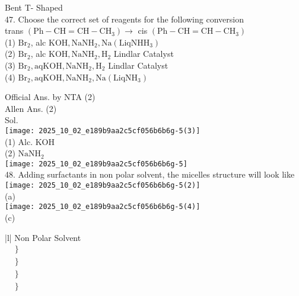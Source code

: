 \documentclass[10pt]{article}
\begin{document}
Bent T- Shaped\\
47. Choose the correct set of reagents for the following conversion\\
trans \(\left(\mathrm{Ph}-\mathrm{CH}=\mathrm{CH}-\mathrm{CH}_{3}\right) \rightarrow\) cis \(\left(\mathrm{Ph}-\mathrm{CH}=\mathrm{CH}-\mathrm{CH}_{3}\right)\)\\
(1) \(\mathrm{Br}_{2}\), alc \(\mathrm{KOH}, \mathrm{NaNH}_{2}, \mathrm{Na}\left(\mathrm{Liq} \mathrm{NH} \mathrm{H}_{3}\right)\)\\
(2) \(\mathrm{Br}_{2}\), alc \(\mathrm{KOH}, \mathrm{NaNH}_{2}, \mathrm{H}_{2}\) Lindlar Catalyst\\
(3) \(\mathrm{Br}_{2}, \mathrm{aq} \mathrm{KOH}, \mathrm{NaNH}_{2}, \mathrm{H}_{2}\) Lindlar Catalyst\\
(4) \(\mathrm{Br}_{2}, \mathrm{aq} \mathrm{KOH}, \mathrm{NaNH}_{2}, \mathrm{Na}\left(\mathrm{Liq} \mathrm{NH}_{3}\right)\)

Official Ans. by NTA (2)\\
Allen Ans. (2)\\
Sol.\\
\texttt{[image: 2025\_10\_02\_e189b9aa2c5cf056b6b6g-5(3)]}\\
(1) Alc. KOH\\
(2) \(\mathrm{NaNH}_{2}\)\\
\texttt{[image: 2025\_10\_02\_e189b9aa2c5cf056b6b6g-5]}\\
48. Adding surfactants in non polar solvent, the micelles structure will look like\\
\texttt{[image: 2025\_10\_02\_e189b9aa2c5cf056b6b6g-5(2)]}\\
(a)\\
\texttt{[image: 2025\_10\_02\_e189b9aa2c5cf056b6b6g-5(4)]}\\
(c)

\begin{center}
\begin{tabular}{|l|}
\hline
Non Polar Solvent \\
\hline
\( \begin{aligned} & \} \\ & \} \\ & \} \\ & \} \end{aligned} \) \\
\hline
\end{tabular}
\end{center}
\end{document}
